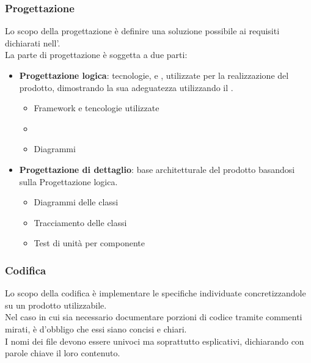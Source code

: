 \subsubsection{Progettazione}
Lo scopo della progettazione è definire una soluzione possibile ai requisiti dichiarati nell'.
\\
La parte di progettazione è soggetta a due parti:
\begin{itemize}
    \item{\textbf{Progettazione logica}}: tecnologie,  e , utilizzate per la realizzazione del prodotto, dimostrando la sua adeguatezza utilizzando il .
    \begin{itemize}
        \item{Framework e tencologie utilizzate}
        \item{}
        \item{Diagrammi }
    \end{itemize}
    \item{\textbf{Progettazione di dettaglio}}: base architetturale del prodotto basandosi sulla Progettazione logica.
    \begin{itemize}
        \item{Diagrammi delle classi}
        \item{Tracciamento delle classi}
        \item{Test di unità per componente}
    \end{itemize}
\end{itemize}
\subsubsection{Codifica}
Lo scopo della codifica è implementare le specifiche individuate concretizzandole su un prodotto utilizzabile.
\\
Nel caso in cui sia necessario documentare porzioni di codice tramite commenti mirati, è d'obbligo che essi siano concisi e chiari.
\\
I nomi dei file devono essere univoci ma soprattutto esplicativi, dichiarando con parole chiave il loro contenuto.